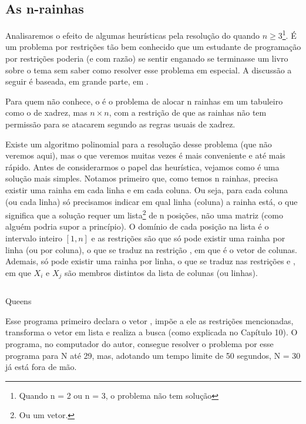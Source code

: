 \documentclass{article}
\begin{document}
\subsection{As n-rainhas}

Analisaremos o efeito de algumas heurísticas pela resolução do  quando $n \geq 3$\footnote{Quando n = 2 ou n = 3, o problema não tem solução}. É um
problema por restrições tão bem conhecido que um estudante de programação por
restrições poderia (e com razão) se sentir enganado se terminasse um livro sobre o tema sem saber
como resolver esse problema em especial. A discussão a seguir é baseada, em grande parte, em
\cite{krzysztof}.

Para quem não conhece, o  é o problema de alocar n rainhas em um
tabuleiro como o de xadrez, mas $n\times n$, com a restrição de que as rainhas não tem permissão
para se atacarem segundo as regras usuais de xadrez.

Existe um algoritmo polinomial para a resolução desse problema (que não veremos aqui), mas o que
veremos muitas vezes é mais conveniente e até mais rápido. Antes de considerarmos o papel das
heurística, vejamos como é uma solução mais simples. Notamos primeiro que, como temos n rainhas,
precisa existir uma rainha em cada linha e em cada coluna. Ou seja, para cada coluna (ou cada linha)
só precisamos indicar em qual linha (coluna) a rainha está, o que significa que a solução requer um
lista\footnote{Ou um vetor.} de n posições, não uma matriz (como alguém podria supor a princípio). O domínio de cada
posição na lista é o intervalo inteiro $[1,n]$ e as restrições são que só pode existir uma rainha
por linha (ou por coluna), o que se traduz na restrição , em que
 é o vetor de colunas. Ademais, só pode existir uma rainha por linha, o que se traduz nas
restrições  e , em que $X_i$ e $X_j$ são membros distintos da lista de colunas (ou linhas).

    \begin{listing}[!h]
    \inputminted{prolog}{../Exemplos/Cap11/prog1_queens.ecl}
    \caption{Queens}
    \end{listing}

Esse programa primeiro declara o vetor , impõe a ele as restrições mencionadas,
transforma o vetor em lista e realiza a busca (como explicada no Capítulo 10).%
O programa, no computador do autor, consegue resolver o problema por esse programa para N até 29,
mas, adotando um tempo limite de 50 segundos, N = 30 já está fora de mão.
\end{document}

